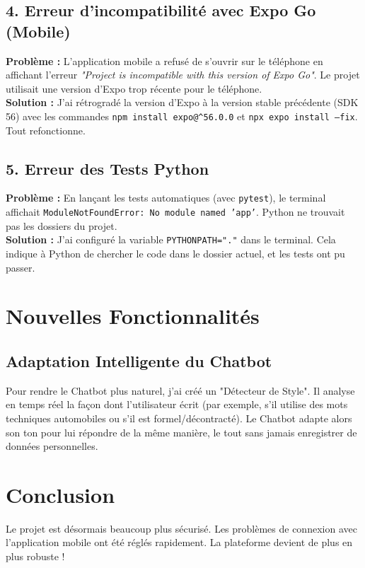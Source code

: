 \documentclass[12pt, a4paper]{article}
\begin{document}
\subsection{4. Erreur d'incompatibilité avec Expo Go (Mobile)}
\textbf{Problème :} L'application mobile a refusé de s'ouvrir sur le téléphone en affichant l'erreur \textit{"Project is incompatible with this version of Expo Go"}. Le projet utilisait une version d'Expo trop récente pour le téléphone. \\
\textbf{Solution :} J'ai rétrogradé la version d'Expo à la version stable précédente (SDK 56) avec les commandes \texttt{npm install expo@\textasciicircum 56.0.0} et \texttt{npx expo install --fix}. Tout refonctionne.

\subsection{5. Erreur des Tests Python}
\textbf{Problème :} En lançant les tests automatiques (avec \texttt{pytest}), le terminal affichait \texttt{ModuleNotFoundError: No module named 'app'}. Python ne trouvait pas les dossiers du projet. \\
\textbf{Solution :} J'ai configuré la variable \texttt{PYTHONPATH="."} dans le terminal. Cela indique à Python de chercher le code dans le dossier actuel, et les tests ont pu passer.

\section{Nouvelles Fonctionnalités}
\subsection{Adaptation Intelligente du Chatbot}
Pour rendre le Chatbot plus naturel, j'ai créé un "Détecteur de Style". Il analyse en temps réel la façon dont l'utilisateur écrit (par exemple, s'il utilise des mots techniques automobiles ou s'il est formel/décontracté). Le Chatbot adapte alors son ton pour lui répondre de la même manière, le tout sans jamais enregistrer de données personnelles.

\section{Conclusion}
Le projet est désormais beaucoup plus sécurisé. Les problèmes de connexion avec l'application mobile ont été réglés rapidement. La plateforme devient de plus en plus robuste !
\end{document}
